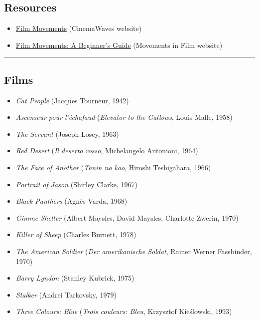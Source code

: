 \documentclass[
  letterpaper,
  DIV=11,
  numbers=noendperiod,
  oneside]{scrartcl}
\providecommand{\tightlist}{%
  \setlength{\itemsep}{0pt}\setlength{\parskip}{0pt}}
\begin{document}
\subsection{Resources}\label{resources}

\begin{itemize}
\tightlist
\item
  \href{https://cinemawavesblog.com/movements//}{Film Movements}
  (CinemaWaves website)
\item
  \href{https://www.movementsinfilm.com/}{Film Movements: A Beginner's
  Guide} (Movements in Film website)
\end{itemize}

\begin{center}\rule{0.5\linewidth}{0.5pt}\end{center}

\subsection{Films}\label{films}

\begin{itemize}
\tightlist
\item
  \emph{Cat People} (Jacques Tourneur, 1942)
\item
  \emph{Ascenseur pour l'échafaud} (\emph{Elevator to the Gallows},
  Louis Malle, 1958)
\item
  \emph{The Servant} (Joseph Losey, 1963)
\item
  \emph{Red Desert} (\emph{Il deserto rosso}, Michelangelo Antonioni,
  1964)
\item
  \emph{The Face of Another} (\emph{Tanin no kao}, Hiroshi Teshigahara,
  1966)
\item
  \emph{Portrait of Jason} (Shirley Clarke, 1967)
\item
  \emph{Black Panthers} (Agnès Varda, 1968)
\item
  \emph{Gimme Shelter} (Albert Maysles, David Maysles, Charlotte Zwerin,
  1970)
\item
  \emph{Killer of Sheep} (Charles Burnett, 1978)
\item
  \emph{The American Soldier} (\emph{Der amerikanische Soldat}, Rainer
  Werner Fassbinder, 1970)
\item
  \emph{Barry Lyndon} (Stanley Kubrick, 1975)
\item
  \emph{Stalker} (Andrei Tarkovsky, 1979)
\item
  \emph{Three Colours: Blue} (\emph{Trois couleurs: Bleu}, Krzysztof
  Kieślowski, 1993)
\end{itemize}
\end{document}
